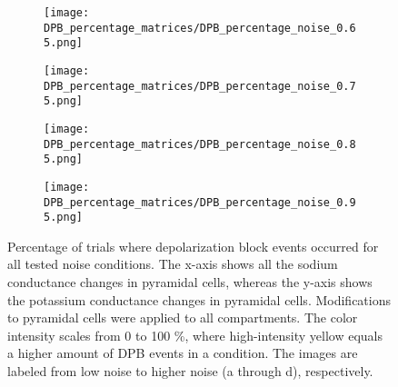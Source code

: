 \begin{figure}[H]
    \centering
    \begin{subfigure}{0.48\textwidth}
        \texttt{[image: DPB\_percentage\_matrices/DPB\_percentage\_noise\_0.65.png]}
        \caption{} %
    \end{subfigure}\hfill
    \begin{subfigure}{0.48\textwidth}
        \texttt{[image: DPB\_percentage\_matrices/DPB\_percentage\_noise\_0.75.png]}
        \caption{} %
    \end{subfigure}

    \bigskip %

    \begin{subfigure}{0.48\textwidth}
        \texttt{[image: DPB\_percentage\_matrices/DPB\_percentage\_noise\_0.85.png]}
        \caption{} %
    \end{subfigure}\hfill
    \begin{subfigure}{0.48\textwidth}
        \texttt{[image: DPB\_percentage\_matrices/DPB\_percentage\_noise\_0.95.png]}
        \caption{} %
    \end{subfigure}

    \caption[DPB percentage matrices]{Percentage of trials where depolarization block events occurred for all tested noise conditions.
    The x-axis shows all the sodium conductance changes in pyramidal cells, whereas the y-axis shows the potassium conductance changes in pyramidal cells.
    Modifications to pyramidal cells were applied to all compartments.
    The color intensity scales from 0 to 100 \%, where high-intensity yellow equals a higher amount of DPB events in a condition.
    The images are labeled from low noise to higher noise (a through d), respectively.}\label{fig:dpb_percentage_matrices}
\end{figure}

